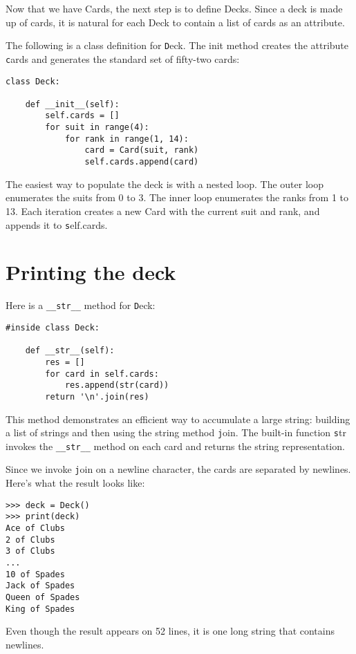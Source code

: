 \documentclass[
DIV=11,
fontsize=13,
twoside,
headinclude=false,
titlepage=firstiscover,
abstract=true,
headsepline=true,
footsepline=true,
chapterprefix=true, %
headings=big,
bibliography=totoc,%
captions=tableheading
]{scrbook}
\theoremstyle{definition}
\begin{document}
Now that we have Cards, the next step is to define Decks.  Since a
deck is made up of cards, it is natural for each Deck to contain a
list of cards as an attribute.

The following is a class definition for {\texttt Deck}.  The
init method creates the attribute {\texttt cards} and generates
the standard set of fifty-two cards:

\begin{lstlisting}
class Deck:

    def __init__(self):
        self.cards = []
        for suit in range(4):
            for rank in range(1, 14):
                card = Card(suit, rank)
                self.cards.append(card)
\end{lstlisting}
%
The easiest way to populate the deck is with a nested loop.  The outer
loop enumerates the suits from 0 to 3.  The inner loop enumerates the
ranks from 1 to 13.  Each iteration
creates a new Card with the current suit and rank,
and appends it to {\texttt self.cards}.


\section{Printing the deck}
\label{printdeck}

Here is a \verb"__str__" method for {\texttt Deck}:

\begin{lstlisting}
#inside class Deck:

    def __str__(self):
        res = []
        for card in self.cards:
            res.append(str(card))
        return '\n'.join(res)
\end{lstlisting}
%
This method demonstrates an efficient way to accumulate a large
string: building a list of strings and then using the string method
{\texttt join}.  The built-in function {\texttt str} invokes the
\verb"__str__" method on each card and returns the string
representation.   
  

Since we invoke {\texttt join} on a newline character, the cards
are separated by newlines.  Here's what the result looks like:

\begin{lstlisting}
>>> deck = Deck()
>>> print(deck)
Ace of Clubs
2 of Clubs
3 of Clubs
...
10 of Spades
Jack of Spades
Queen of Spades
King of Spades
\end{lstlisting}
%
Even though the result appears on 52 lines, it is
one long string that contains newlines.
\end{document}
